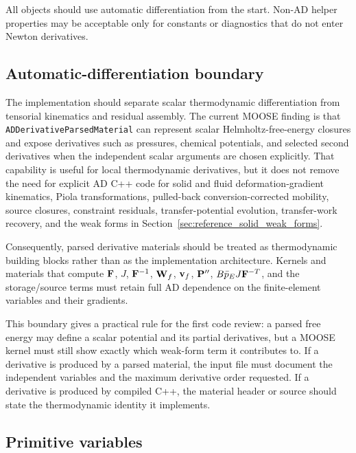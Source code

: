 All objects should use automatic differentiation from the start.  Non-AD helper
properties may be acceptable only for constants or diagnostics that do not enter
Newton derivatives.

\subsection{Automatic-differentiation boundary}
\label{sec:ad_boundary}

The implementation should separate scalar thermodynamic differentiation from
tensorial kinematics and residual assembly.  The current MOOSE finding is that
\texttt{ADDerivativeParsedMaterial} can represent scalar Helmholtz-free-energy
closures and expose derivatives such as pressures, chemical potentials, and
selected second derivatives when the independent scalar arguments are chosen
explicitly.  That capability is useful for local thermodynamic derivatives, but
it does not remove the need for explicit AD C++ code for solid and fluid
deformation-gradient kinematics, Piola transformations, pulled-back
conversion-corrected mobility, source closures, constraint residuals,
transfer-potential evolution, transfer-work recovery, and the weak forms in
Section~\ref{sec:reference_solid_weak_forms}.

Consequently, parsed derivative materials should be treated as thermodynamic
building blocks rather than as the implementation architecture.  Kernels and
materials that compute \(\mathbf{F}\), \(J\), \(\mathbf{F}^{-1}\), \(\mathbf{W}_f\),
\(\mathbf{v}_f\), \(\mathbf{P}^{\prime\prime}\),
\(B\bar p_EJ\mathbf{F}^{-T}\), and the storage/source terms must retain full AD
dependence on the finite-element variables and their gradients.

This boundary gives a practical rule for the first code review: a parsed free
energy may define a scalar potential and its partial derivatives, but a MOOSE
kernel must still show exactly which weak-form term it contributes to.  If a
derivative is produced by a parsed material, the input file must document the
independent variables and the maximum derivative order requested.  If a
derivative is produced by compiled C++, the material header or source should
state the thermodynamic identity it implements.

\subsection{Primitive variables}
\label{sec:primitive_variables}

